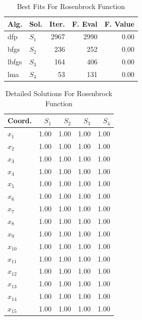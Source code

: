\documentclass[conference]{IEEEtran}
\begin{document}
\begin{table}[H]
\centering
\caption{Best Fits For Rosenbrock Function}
\label{solutions:rosenbrock30d}
\begin{tabular}{llrrr}
\toprule
 Alg. &    Sol. &  Iter. &  F. Eval &  F. Value \\
\midrule
  dfp & $S_{1}$ &   2967 &     2990 &      0.00 \\
 bfgs & $S_{2}$ &    236 &      252 &      0.00 \\
lbfgs & $S_{3}$ &    164 &      406 &      0.00 \\
  lma & $S_{4}$ &     53 &      131 &      0.00 \\
\bottomrule
\end{tabular}
\end{table}

\begin{table}[H]
\centering
\caption{Detailed Solutions For Rosenbrock Function}
\label{detailedsolutions:rosenbrock30d}
\begin{tabular}{lrrrr}
\toprule
  Coord. &  $S_{1}$ &  $S_{2}$ &  $S_{3}$ &  $S_{4}$ \\
\midrule
 $x_{1}$ &     1.00 &     1.00 &     1.00 &     1.00 \\
 $x_{2}$ &     1.00 &     1.00 &     1.00 &     1.00 \\
 $x_{3}$ &     1.00 &     1.00 &     1.00 &     1.00 \\
 $x_{4}$ &     1.00 &     1.00 &     1.00 &     1.00 \\
 $x_{5}$ &     1.00 &     1.00 &     1.00 &     1.00 \\
 $x_{6}$ &     1.00 &     1.00 &     1.00 &     1.00 \\
 $x_{7}$ &     1.00 &     1.00 &     1.00 &     1.00 \\
 $x_{8}$ &     1.00 &     1.00 &     1.00 &     1.00 \\
 $x_{9}$ &     1.00 &     1.00 &     1.00 &     1.00 \\
$x_{10}$ &     1.00 &     1.00 &     1.00 &     1.00 \\
$x_{11}$ &     1.00 &     1.00 &     1.00 &     1.00 \\
$x_{12}$ &     1.00 &     1.00 &     1.00 &     1.00 \\
$x_{13}$ &     1.00 &     1.00 &     1.00 &     1.00 \\
$x_{14}$ &     1.00 &     1.00 &     1.00 &     1.00 \\
$x_{15}$ &     1.00 &     1.00 &     1.00 &     1.00 \\

\end{tabular}
\end{table}
\end{document}
